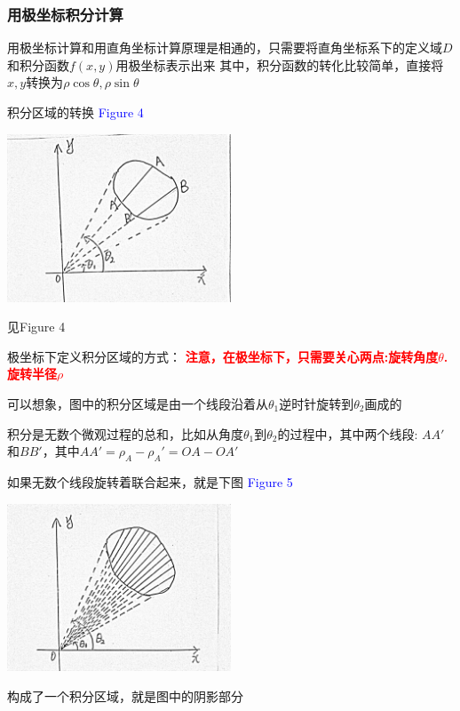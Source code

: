 \documentclass[a4paper]{ctexart}
\begin{document}
\begin{multicols}{2}
\subsubsection{用极坐标积分计算}
\par 用极坐标计算和用直角坐标计算原理是相通的，只需要将直角坐标系下的定义域$D$和积分函数$f(x,y)$用极坐标表示出来
其中，积分函数的转化比较简单，直接将$x,y$转换为$\rho\cos{\theta}, \rho{\sin{\theta}}$
\par 积分区域的转换
\textcolor{blue}{Figure 4}
\begin{center}
\includegraphics[height=5cm]{lecture7/Figure4.jpg}
\end{center}
\par 见Figure 4
\par 极坐标下定义积分区域的方式：
\textbf{\textcolor{red}{注意，在极坐标下，只需要关心两点:旋转角度$\theta$. 旋转半径$\rho$}}
\par 可以想象，图中的积分区域是由一个线段沿着从$\theta_1$逆时针旋转到$\theta_2$画成的
\par 积分是无数个微观过程的总和，比如从角度$\theta_1$到$\theta_2$的过程中，其中两个线段: $AA'$和$BB'$，其中$AA' = \rho_A - \rho_A' = OA - OA'$
\par 如果无数个线段旋转着联合起来，就是下图
\textcolor{blue}{Figure 5}
\begin{center}
\includegraphics[height=5cm]{lecture7/Figure5.jpg}
\end{center}
\par 构成了一个积分区域，就是图中的阴影部分


\end{multicols}
\end{document}
